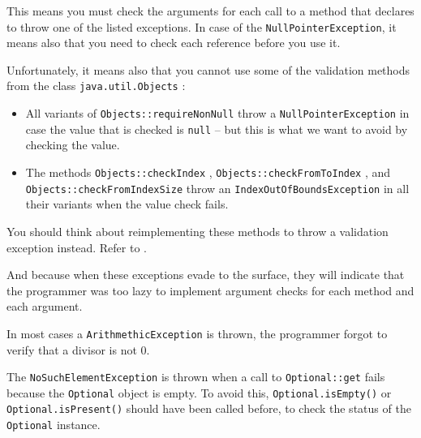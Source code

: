 This means you must check the arguments for each call to a method that declares to throw one of the listed exceptions. In case of the \lstinline|NullPointerException|, it means also that you need to check each reference before you use it.

Unfortunately, it means also that you cannot use some of the validation methods from the class \lstinline|java.util.Objects| \autocite{ORACLE_DOC_OBJECTS_CLASS}:
\begin{itemize}
	\item{All variants of \lstinline|Objects::requireNonNull| \autocite{ORACLE_DOC_OBJECTS:requireNonNull} throw a \lstinline|NullPointerException| in case the value that is checked is \lstinline|null| – but this is what we want to avoid by checking the value.}
	
	\item{The methods \lstinline|Objects::checkIndex| \autocite{ORACLE_DOC_OBJECTS:checkIndex}, \lstinline|Objects::checkFromToIndex| \autocite{ORACLE_DOC_OBJECTS:checkFromToIndex}, and \lstinline|Objects::checkFromIndexSize| \autocite{ORACLE_DOC_OBJECTS:checkFromIndexSize} throw an \lstinline|IndexOutOfBoundsException| in all their variants  when the value check fails.}
	

\end{itemize}

You should think about reimplementing these methods to throw a validation exception instead. Refer to \autocite{TQUADRAT_ORG_FOUNDATION_OBJECTS}.

And  because when these exceptions evade to the surface, they will indicate that the programmer was too lazy to implement argument checks for each method and each argument.

In most cases a \lstinline|ArithmethicException| is thrown, the programmer forgot to verify that a divisor is not 0.

The \lstinline|NoSuchElementException| is thrown when a call to \lstinline|Optional::get| \autocite{ORACLE_DOC_OPTIONAL:get} fails because the \lstinline|Optional| \autocite{ORACLE_DOC_OPTIONAL_CLASS} object is empty. To avoid this, \lstinline|Optional.isEmpty()| \autocite{ORACLE_DOC_OPTIONAL:isEmpty} or \lstinline|Optional.isPresent()| \autocite{ORACLE_DOC_OPTIONAL:isPresent} should have been called before, to check the status of the \lstinline|Optional| instance.

